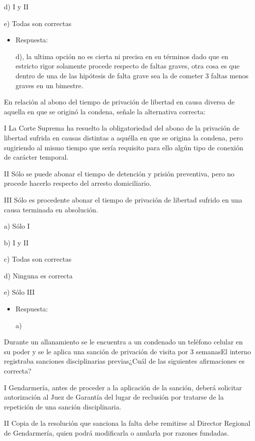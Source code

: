 \documentclass[letterpaper, 11pt]{article}
\begin{document}
d) I y II

e) Todas son correctas

\begin{itemize}
\item Respuesta:

d), la ultima opción no es cierta ni precisa en su términos dado que
en estricto rigor solamente procede respecto de faltas graves, otra
cosa es que dentro de una de las hipótesis de falta grave sea la de
cometer 3 faltas menos graves en un bimestre.
\end{itemize}


En relación al abono del tiempo de privación de libertad en causa
diversa de aquella en que se originó la condena, señale la alternativa
correcta:


I La Corte Suprema ha resuelto la obligatoriedad del abono de la
privación de libertad sufrida en causas distintas a aquélla en que se
origina la condena, pero sugiriendo al mismo tiempo que sería
requisito para ello algún tipo de conexión de carácter temporal.

II Sólo se puede abonar el tiempo de detención y prisión preventiva,
pero no procede hacerlo respecto del arresto domiciliario.

III Sólo es procedente abonar el tiempo de privación de libertad
sufrido en una causa terminada en absolución.


a) Sólo I

b) I y II

c) Todas son correctas

d) Ninguna es correcta

e) Sólo III

\begin{itemize}
\item Respuesta:

a)
\end{itemize}


Durante un allanamiento se le encuentra a un condenado un teléfono
celular en su poder y se le aplica una sanción de privación de visita
por 3 semanasEl interno registraba sanciones disciplinarias
previas¿Cuál de las siguientes afirmaciones es correcta?

I Gendarmería, antes de proceder a la aplicación de la sanción, deberá
solicitar autorización al Juez de Garantía del lugar de reclusión por
tratarse de la repetición de una sanción disciplinaria.

II Copia de la resolución que sanciona la falta debe remitirse al
Director Regional de Gendarmería, quien podrá modificarla o anularla
por razones fundadas.
\end{document}

